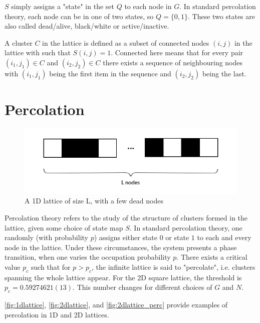 $S$ simply assigns a "state" in the set $Q$ to each node in $G$. In standard percolation theory, each node can be in one of two states, so $Q = \{0, 1\}$. These two states are also called dead/alive, black/white or active/inactive.

A cluster $C$ in the lattice is defined as a subset of connected nodes $(i, j)$ in the lattice with such that $S(i, j) = 1$. Connected here means that for every pair $(i_1, j_1) \in C$ and $(i_2, j_2) \in C$ there exists a sequence of neighbouring nodes with $(i_1, j_1)$ being the first item in the sequence and $(i_2, j_2)$ being the last.



\section{Percolation}

\begin{figure}[h]
  \includegraphics[width=\linewidth]{Images/1dlattice.png}
  \caption{A 1D lattice of size L, with a few dead nodes}
  \label{fig:1dlattice}
\end{figure}


Percolation theory refers to the study of the structure of clusters formed in the lattice, given some choice of state map $S$. In standard percolation theory, one randomly (with probability $p$) assigns either state $0$ or state $1$ to each and every node in the lattice. Under these circumstances, the system presents a phase transition, when one varies the occupation probability $p$. There exists a critical value $p_c$ such that for $p > p_c$, the infinite lattice is said to "percolate", i.e. clusters spanning the whole lattice appear. For the 2D square lattice, the threshold is $p_c = 0.59274621(13)$\cite{Newman2000EfficientMC}. This number changes for different choices of $G$ and $N$.


\autoref{fig:1dlattice}, \autoref{fig:2dlattice}, and \autoref{fig:2dlattice_perc}  provide examples of percolation in 1D and 2D lattices.



